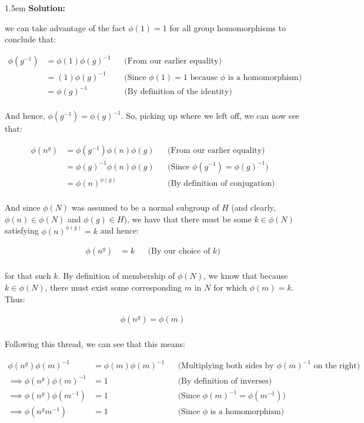 \documentclass{article}
\newenvironment{solution}{
	\vspace{.5em}
	\par
	\begin{adjustwidth}{1.5em}{}
	\textbf{{Solution:}}
	\par
	\vspace{.5em}
}{
	\vspace{1em}
	\end{adjustwidth}
	\setcounter{step}{0}
	\newpage
}
\newcounter{step}
\begin{document}
\begin{solution}
	we can take advantage of the fact $\phi(1) = 1$ for all group homomorphisms to conclude that:

	\begin{align*}
		\phi(g^{-1}) &= \phi(1)\phi(g)^{-1} &&\text{(From our earlier equality)} \\
		&= (1)\phi(g)^{-1} &&\text{(Since $\phi(1) = 1$ because $\phi$ is a homomorphism)} \\
		&= \phi(g)^{-1} &&\text{(By definition of the identity)} \\
	\end{align*}

	And hence, $\phi(g^{-1}) = \phi(g)^{-1}$. So, picking up where we left off, we can now see that:

	\begin{align*}
		\phi(n^{g}) &= \phi(g^{-1})\phi(n)\phi(g) &&\text{(From our earlier equality)} \\
		&= \phi(g)^{-1}\phi(n)\phi(g) &&\text{(Since $\phi(g^{-1}) = \phi(g)^{-1}$)} \\
		&= \phi(n)^{\phi(g)} &&\text{(By definition of conjugation)} \\
	\end{align*}

	And since $\phi(N)$ was assumed to be a normal subgroup of $H$ (and clearly, $\phi(n) \in \phi(N)$ and $\phi(g) \in H$), we have that there must be some $k \in \phi(N)$ satisfying $\phi(n)^{\phi(g)} = k$ and hence:

	\begin{align*}
		\phi(n^{g}) &= k &&\text{(By our choice of $k$)} \\
	\end{align*}

	for that such $k$. By definition of membership of $\phi(N)$, we know that because $k \in \phi(N)$, there must exist some corresponding $m$ in $N$ for which $\phi(m) = k$. Thus:

	\begin{align*}
		\phi(n^{g}) = \phi(m) \\
	\end{align*}

	Following this thread, we can see that this means:

	\begin{align*}
		\phi(n^{g})\phi(m)^{-1} &= \phi(m)\phi(m)^{-1} &&\text{(Multiplying both sides by $\phi(m)^{-1}$ on the right)} \\
		\implies \phi(n^{g})\phi(m)^{-1} &= 1 &&\text{(By definition of inverses)} \\
		\implies \phi(n^{g})\phi(m^{-1}) &= 1 &&\text{(Since $\phi(m)^{-1} = \phi(m^{-1})$)} \\
		\implies \phi(n^{g}m^{-1}) &= 1 &&\text{(Since $\phi$ is a homomorphism)} \\
	\end{align*}


\end{solution}
\end{document}
